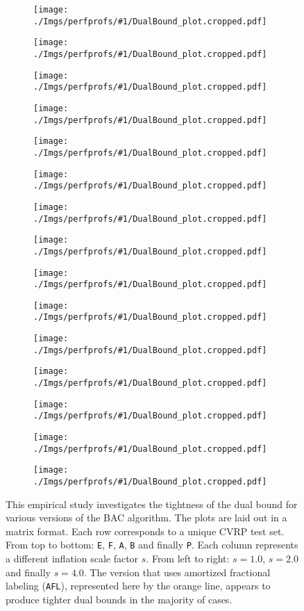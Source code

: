 
\newcommand{\IncludePerfProfSubFiguresBatchOne}[1]{
	\begin{subfigure}{0.30\textwidth}
		\centering
		\texttt{[image: ./Imgs/perfprofs/\#1/DualBound\_plot.cropped.pdf]}
	\end{subfigure}
}

\begin{figure}[t]
	\IncludePerfProfSubFiguresBatchOne{Fractional-labeling-comparison-for-E-scaled-1.0}
	\hfill
	\IncludePerfProfSubFiguresBatchOne{Fractional-labeling-comparison-for-E-scaled-2.0}
	\hfill
	\IncludePerfProfSubFiguresBatchOne{Fractional-labeling-comparison-for-E-scaled-4.0}

	\IncludePerfProfSubFiguresBatchOne{Fractional-labeling-comparison-for-F-scaled-1.0}
	\hfill
	\IncludePerfProfSubFiguresBatchOne{Fractional-labeling-comparison-for-F-scaled-2.0}
	\hfill
	\IncludePerfProfSubFiguresBatchOne{Fractional-labeling-comparison-for-F-scaled-4.0}

	\IncludePerfProfSubFiguresBatchOne{Fractional-labeling-comparison-for-A-scaled-1.0}
	\hfill
	\IncludePerfProfSubFiguresBatchOne{Fractional-labeling-comparison-for-A-scaled-2.0}
	\hfill
	\IncludePerfProfSubFiguresBatchOne{Fractional-labeling-comparison-for-A-scaled-4.0}

	\IncludePerfProfSubFiguresBatchOne{Fractional-labeling-comparison-for-B-scaled-1.0}
	\hfill
	\IncludePerfProfSubFiguresBatchOne{Fractional-labeling-comparison-for-B-scaled-2.0}
	\hfill
	\IncludePerfProfSubFiguresBatchOne{Fractional-labeling-comparison-for-B-scaled-4.0}

	\IncludePerfProfSubFiguresBatchOne{Fractional-labeling-comparison-for-P-scaled-1.0}
	\hfill
	\IncludePerfProfSubFiguresBatchOne{Fractional-labeling-comparison-for-P-scaled-2.0}
	\hfill
	\IncludePerfProfSubFiguresBatchOne{Fractional-labeling-comparison-for-P-scaled-2.0}

	\caption{
		This empirical study investigates the tightness of the dual bound for various versions of the BAC algorithm.
		The plots are laid out in a matrix format.
		Each row corresponds to a unique CVRP test set.
		From top to bottom: \texttt{E}, \texttt{F}, \texttt{A}, \texttt{B} and finally \texttt{P}.
		Each column represents a different inflation scale factor $s$.
		From left to right: $s = 1.0$, $s = 2.0$ and finally $s = 4.0$.
		The version that uses amortized fractional labeling (\texttt{AFL}), represented here by the orange line, appears to produce tighter dual bounds in the majority of cases.
	}
	\label{fig:perfprofs-batch1-part1}
\end{figure}
